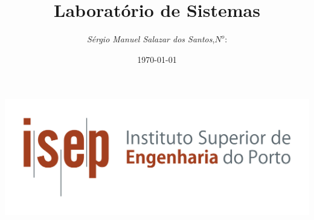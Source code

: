 \begin{titlepage}
\begin{minipage}{0.95\linewidth}
\centering
\includegraphics[scale=0.60]{./Image/Capa/ISEP_marca_cor_grande.png}
\label{Capa}
\title{Laborat\'{o}rio de Sistemas}
\author{\emph{S\'{e}rgio Manuel Salazar dos Santos},\;$N^o$:}
\date{\today}
\maketitle
\end{minipage}
\end{titlepage}